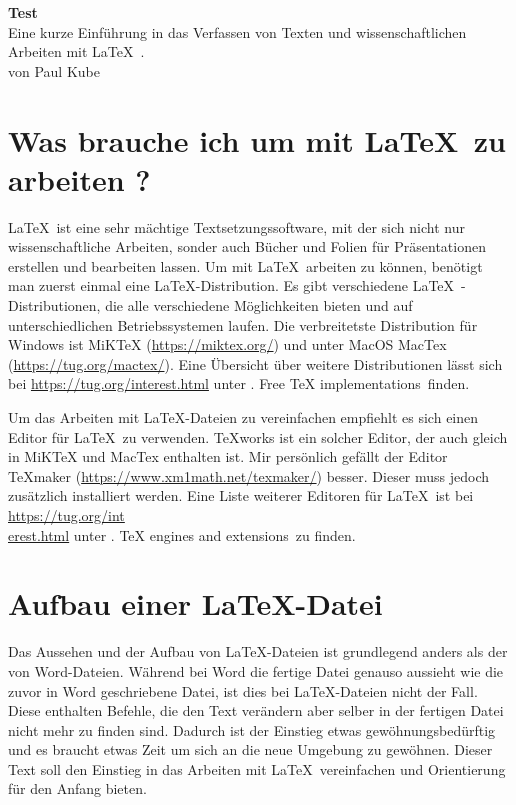 \documentclass[a4paper, 12pt]{scrreprt}
\begin{document}
\begin{titlepage}

\begin{center}
\vspace*{2cm}
{\bfseries\LARGE Test\\} 
\vspace{3cm}
Eine kurze Einführung in das Verfassen von Texten und wissenschaftlichen Arbeiten mit \LaTeX\, .\\
\vspace{4cm}
von Paul Kube
\end{center}

\end{titlepage}

\tableofcontents
\thispagestyle{empty}
\newpage
\setcounter{page}{1}

\chapter{Was brauche ich um mit \LaTeX\, zu arbeiten ?}
\LaTeX\, ist eine sehr mächtige Textsetzungssoftware, mit der sich nicht nur wissenschaftliche Arbeiten, sonder auch Bücher und Folien für Präsentationen erstellen und bearbeiten lassen. Um mit \LaTeX\, arbeiten zu können, benötigt man zuerst einmal eine \LaTeX -Distribution. Es gibt verschiedene \LaTeX\, -Distributionen, die alle verschiedene Möglichkeiten bieten und auf unterschiedlichen Betriebssystemen laufen. Die verbreitetste Distribution für Windows ist MiKTeX (\href{https://miktex.org/}{https://miktex.org/}) und unter MacOS MacTex (\href{https://tug.org/mactex/}{https://tug.org/mactex/}). Eine Übersicht über weitere Distributionen lässt sich bei \href{https://tug.org/interest.html}{https://tug.org/interest.html} unter . Free TeX implementations\grqq\, finden.

Um das Arbeiten mit \LaTeX -Dateien zu vereinfachen empfiehlt es sich einen Editor für \LaTeX\, zu verwenden. TeXworks ist ein solcher Editor, der auch gleich in MiKTeX und MacTex enthalten ist. Mir persönlich gefällt der Editor TeXmaker (\href{https://www.xm1math.net/texmaker/}{https://www.xm1math.net/texmaker/}) besser. Dieser muss jedoch zusätzlich installiert werden. Eine Liste weiterer Editoren für \LaTeX\, ist bei \href{https://tug.org/interest.html}{https://tug.org/int\\erest.html} unter . TeX engines and extensions\grqq\, zu finden.
 
\chapter{Aufbau einer \LaTeX -Datei}
Das Aussehen und der Aufbau von \LaTeX -Dateien ist grundlegend anders als der von Word-Dateien. Während bei Word die fertige Datei genauso aussieht wie die zuvor in Word geschriebene Datei, ist dies bei \LaTeX-Dateien nicht der Fall. Diese enthalten Befehle, die den Text verändern aber selber in der fertigen Datei nicht mehr zu finden sind. Dadurch ist der Einstieg etwas gewöhnungsbedürftig und es braucht etwas Zeit um sich an die neue Umgebung zu gewöhnen. Dieser Text soll den Einstieg in das Arbeiten mit \LaTeX\, vereinfachen und Orientierung für den Anfang bieten.\\
\end{document}
